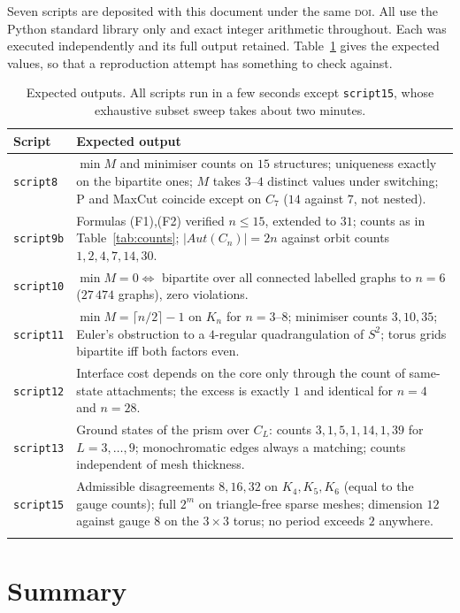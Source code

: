 \documentclass[11pt,a4paper]{article}
\def\mathrm#1{#1}%
\newcommand{\Aut}{\mathrm{Aut}}
\newcommand{\Kn}{K_n}
\begin{document}
Seven scripts are deposited with this document under the same \textsc{doi}. All use the Python standard library only and exact integer arithmetic throughout. Each was executed independently and its full output retained. Table~\ref{tab:scripts} gives the expected values, so that a reproduction attempt has something to check against.

\begin{longtable}{p{2.3cm}p{11.6cm}}
\toprule
\textbf{Script} & \textbf{Expected output} \\
\midrule
\endhead
\texttt{script8} & $\min M$ and minimiser counts on $15$ structures; uniqueness exactly on the bipartite ones; $M$ takes $3$--$4$ distinct values under switching; P and MaxCut coincide except on $C_7$ ($14$ against $7$, not nested). \\
\texttt{script9b} & Formulas (F1),(F2) verified $n\le15$, extended to $31$; counts as in Table~\ref{tab:counts}; $|\Aut(C_n)|=2n$ against orbit counts $1,2,4,7,14,30$. \\
\texttt{script10} & $\min M=0\iff$ bipartite over all connected labelled graphs to $n=6$ ($27\,474$ graphs), zero violations. \\
\texttt{script11} & $\min M=\lceil n/2\rceil-1$ on $\Kn$ for $n=3$--$8$; minimiser counts $3,10,35$; Euler's obstruction to a $4$-regular quadrangulation of $S^2$; torus grids bipartite iff both factors even. \\
\texttt{script12} & Interface cost depends on the core only through the count of same-state attachments; the excess is exactly $1$ and identical for $n=4$ and $n=28$. \\
\texttt{script13} & Ground states of the prism over $C_L$: counts $3,1,5,1,14,1,39$ for $L=3,\dots,9$; monochromatic edges always a matching; counts independent of mesh thickness. \\
\texttt{script15} & Admissible disagreements $8,16,32$ on $K_4,K_5,K_6$ (equal to the gauge counts); full $2^m$ on triangle-free sparse meshes; dimension $12$ against gauge $8$ on the $3\times3$ torus; no period exceeds $2$ anywhere. \\
\bottomrule
\caption{Expected outputs. All scripts run in a few seconds except \texttt{script15}, whose exhaustive subset sweep takes about two minutes.}
\label{tab:scripts}
\end{longtable}

\section{Summary}
\label{sec:summary}
\end{document}
